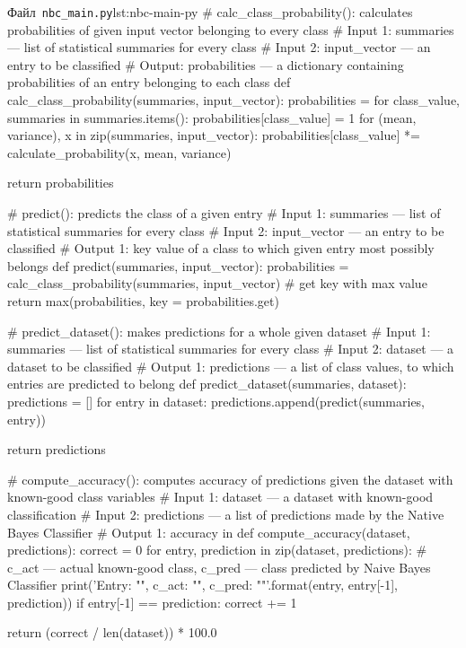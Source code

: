 \documentclass[
	a4paper,
	oneside,
	DIV = 12,
	fontsize = 13pt,
	headings = normal,
	numbers = endperiod,
	bibliography = totoc, %
]{scrartcl}
\theoremstyle{mythm}
\newcommand{\filename}[1]{\texttt{#1}}
\begin{document}
\begin{listingpython}[toprule = 0pt, bottomrule = 0pt]{Файл~\filename{nbc\_main.py}}{lst:nbc-main-py}
# calc_class_probability(): calculates probabilities of given input vector belonging to every class
# Input 1: summaries --- list of statistical summaries for every class
# Input 2: input_vector --- an entry to be classified
# Output: probabilities --- a dictionary containing probabilities of an entry belonging to each class
def calc_class_probability(summaries, input_vector):
    probabilities = {}
    for class_value, summaries in summaries.items():
        probabilities[class_value] = 1
        for (mean, variance), x in zip(summaries, input_vector):
            probabilities[class_value] *= calculate_probability(x, mean, variance)

    return probabilities

# predict(): predicts the class of a given entry
# Input 1: summaries --- list of statistical summaries for every class
# Input 2: input_vector --- an entry to be classified
# Output 1: key value of a class to which given entry most possibly belongs
def predict(summaries, input_vector):
    probabilities = calc_class_probability(summaries, input_vector)
    # get key with max value
    return max(probabilities, key = probabilities.get)

# predict_dataset(): makes predictions for a whole given dataset
# Input 1: summaries --- list of statistical summaries for every class
# Input 2: dataset --- a dataset to be classified
# Output 1: predictions --- a list of class values, to which entries are predicted to belong
def predict_dataset(summaries, dataset):
    predictions = []
    for entry in dataset:
        predictions.append(predict(summaries, entry))

    return predictions

# compute_accuracy(): computes accuracy of predictions given the dataset with known-good class variables
# Input 1: dataset --- a dataset with known-good classification
# Input 2: predictions --- a list of predictions made by the Native Bayes Classifier
# Output 1: accuracy in %
def compute_accuracy(dataset, predictions):
    correct = 0
    for entry, prediction in zip(dataset, predictions):
        # c_act --- actual known-good class, c_pred --- class predicted by Naive Bayes Classifier
        print('Entry: "{}", c_act: "{}", c_pred: "{}"'.format(entry, entry[-1], prediction))
        if entry[-1] == prediction:
            correct += 1

    return (correct / len(dataset)) * 100.0

		\end{listingpython}
\end{document}
